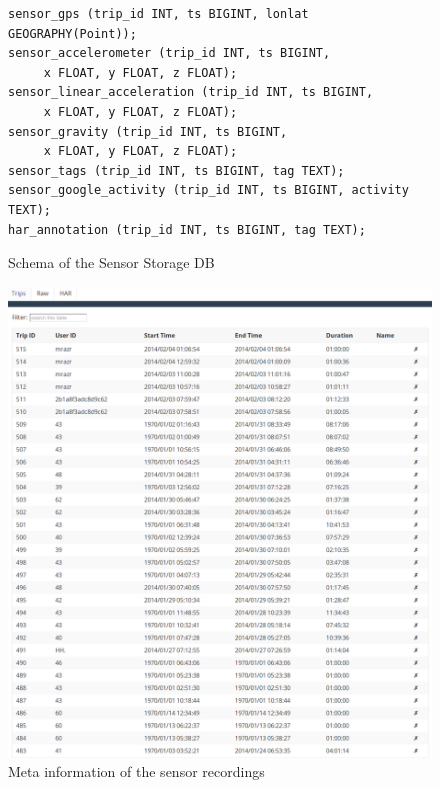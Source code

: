 \begin{figure}
{\small
\begin{verbatim}
sensor_gps (trip_id INT, ts BIGINT, lonlat GEOGRAPHY(Point));
sensor_accelerometer (trip_id INT, ts BIGINT, 
     x FLOAT, y FLOAT, z FLOAT);
sensor_linear_acceleration (trip_id INT, ts BIGINT,
     x FLOAT, y FLOAT, z FLOAT);
sensor_gravity (trip_id INT, ts BIGINT, 
     x FLOAT, y FLOAT, z FLOAT);
sensor_tags (trip_id INT, ts BIGINT, tag TEXT);
sensor_google_activity (trip_id INT, ts BIGINT, activity TEXT);
har_annotation (trip_id INT, ts BIGINT, tag TEXT);
\end{verbatim}}
\label{fig:db_scheme}
\caption{Schema of the Sensor Storage DB}
\end{figure}

\begin{figure}[ht]
  \begin{minipage}[b]{0.45\linewidth}
    \includegraphics[width=0.9 \textwidth]{img/sc/inspection_table.png}
    \caption{Meta information of the sensor recordings}\label{fig:minipage1}
  \end{minipage}\quad
  \begin{minipage}[b]{0.45\linewidth}

\end{minipage}
\end{figure}
